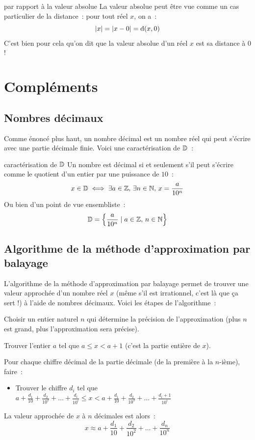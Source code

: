 \begin{remarque}{}{par rapport à la valeur absolue}
    La valeur absolue peut être vue comme un cas particulier de la distance~: pour tout réel $x$, on a~:
    $$ |x| = |x-0   |=\mathrm{d}(x, 0) $$
    C'est bien pour cela qu'on dit que la valeur absolue d'un réel $x$ est sa distance à 0 !
\end{remarque}

\section{Compléments}
\subsection{Nombres décimaux}
Comme énoncé plus haut, un nombre décimal est un nombre réel qui peut s'écrire avec une partie décimale finie. Voici une caractérisation de $\mathbb{D}$~:
\begin{proposition}{}{caractérisation de $\mathbb{D}$}
    Un nombre est décimal si et seulement s'il peut s'écrire comme le quotient d'un entier par une puissance de $10$~:
    $$ x \in \mathbb{D} \iff \exists a \in \mathbb{Z},\,  \exists n \in \mathbb{N},\,  x = \frac{a}{10^n} $$
    Ou bien d'un point de vue ensembliste~:
    $$ \mathbb{D} = \left\{ \frac{a}{10^n} \mid a \in \mathbb{Z},\,  n \in \mathbb{N} \right\} $$
\end{proposition}

\subsection{Algorithme de la méthode d'approximation par balayage}

L'algorithme de la méthode d'approximation par balayage permet de trouver une valeur approchée d'un nombre réel $x$ (même s'il est irrationnel, c'est là que ça sert !) à l'aide de nombres décimaux. Voici les étapes de l'algorithme~:
\begin{enumeratebf}
    \item Choisir un entier naturel $n$ qui détermine la précision de l'approximation (plus $n$ est grand, plus l'approximation sera précise).
    \item Trouver l'entier $a$ tel que $a \leq x < a + 1$ (c'est la partie entière de $x$).
    \item Pour chaque chiffre décimal de la partie décimale (de la première à la $n$-ième), faire~:
    \begin{itemize}
        \item Trouver le chiffre $d_i$ tel que $a + \frac{d_1}{10} + \frac{d_2}{10^2} + \dots + \frac{d_i}{10^i} \leq x < a + \frac{d_1}{10} + \frac{d_2}{10^2} + \dots + \frac{d_i + 1}{10^i}$
    \end{itemize}
    \item La valeur approchée de $x$ à $n$ décimales est alors~:
    $$ x \approx a + \frac{d_1}{10} + \frac{d_2}{10^2} + \dots + \frac{d_n}{10^n} $$
\end{enumeratebf}

